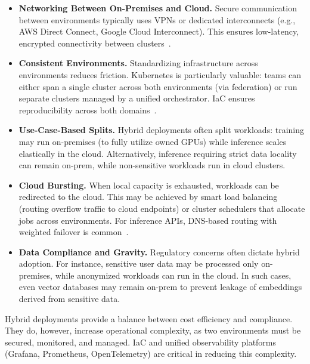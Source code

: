 \begin{itemize}
    \item \textbf{Networking Between On-Premises and Cloud.}  
    Secure communication between environments typically uses VPNs or dedicated interconnects (e.g., AWS Direct Connect, Google Cloud Interconnect). 
    This ensures low-latency, encrypted connectivity between clusters~\cite{terraform-docs}. 

    \item \textbf{Consistent Environments.}  
    Standardizing infrastructure across environments reduces friction. 
    Kubernetes is particularly valuable: teams can either span a single cluster across both environments (via federation) or run separate clusters managed by a unified orchestrator. 
    IaC ensures reproducibility across both domains~\cite{pulumi-docs}. 

    \item \textbf{Use-Case-Based Splits.}  
    Hybrid deployments often split workloads: training may run on-premises (to fully utilize owned GPUs) while inference scales elastically in the cloud. 
    Alternatively, inference requiring strict data locality can remain on-prem, while non-sensitive workloads run in cloud clusters.

    \item \textbf{Cloud Bursting.}  
    When local capacity is exhausted, workloads can be redirected to the cloud. 
    This may be achieved by smart load balancing (routing overflow traffic to cloud endpoints) or cluster schedulers that allocate jobs across environments. 
    For inference APIs, DNS-based routing with weighted failover is common~\cite{awscdk-docs}. 

    \item \textbf{Data Compliance and Gravity.}  
    Regulatory concerns often dictate hybrid adoption. 
    For instance, sensitive user data may be processed only on-premises, while anonymized workloads can run in the cloud. 
    In such cases, even vector databases may remain on-prem to prevent leakage of embeddings derived from sensitive data.
\end{itemize}

Hybrid deployments provide a balance between cost efficiency and compliance. 
They do, however, increase operational complexity, as two environments must be secured, monitored, and managed. 
IaC and unified observability platforms (Grafana, Prometheus, OpenTelemetry) are critical in reducing this complexity. 

